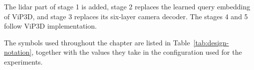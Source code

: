The \ac{lidar} part of stage 1 is
added, stage 2 replaces the learned query embedding of ViP3D, and stage 3 replaces its six-layer camera
decoder. The stages 4 and 5 follow ViP3D implementation.


The symbols used throughout the chapter are listed in Table~\ref{tab:design-notation}, together with the
values they take in the configuration used for the experiments.

